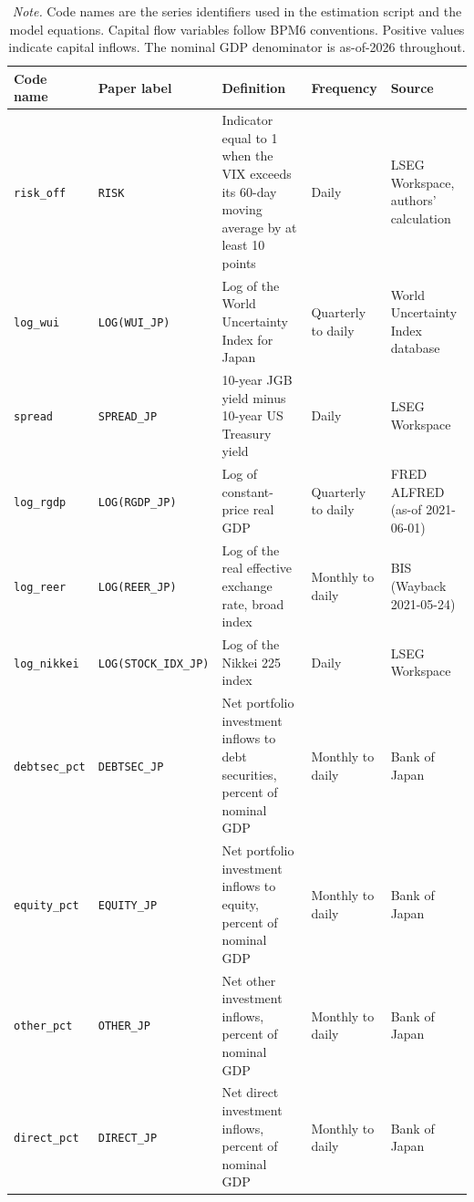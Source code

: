 \begin{table}[H]
  \centering
  \caption{Endogenous Variables, Definitions, and Sources}
  \label{tab:variables}
  \small
  \begin{tabularx}{\textwidth}{@{}p{2.0cm} p{2.5cm} X p{1.7cm} p{2.8cm}@{}}
    \toprule
    Code name & Paper label & Definition & Frequency & Source \\
    \midrule
    \texttt{risk\_off} & \texttt{RISK} & Indicator equal to 1 when the VIX exceeds its 60-day moving average by at least 10 points & Daily & LSEG Workspace, authors' calculation \\
    \texttt{log\_wui} & \texttt{LOG(WUI\_JP)} & Log of the World Uncertainty Index for Japan & Quarterly to daily & World Uncertainty Index database \\
    \texttt{spread} & \texttt{SPREAD\_JP} & 10-year JGB yield minus 10-year US Treasury yield & Daily & LSEG Workspace \\
    \texttt{log\_rgdp} & \texttt{LOG(RGDP\_JP)} & Log of constant-price real GDP & Quarterly to daily & FRED ALFRED (as-of 2021-06-01) \\
    \texttt{log\_reer} & \texttt{LOG(REER\_JP)} & Log of the real effective exchange rate, broad index & Monthly to daily & BIS (Wayback 2021-05-24) \\
    \texttt{log\_nikkei} & \texttt{LOG(STOCK\_\-IDX\_\-JP)} & Log of the Nikkei 225 index & Daily & LSEG Workspace \\
    \texttt{debtsec\_\-pct} & \texttt{DEBTSEC\_JP} & Net portfolio investment inflows to debt securities, percent of nominal GDP & Monthly to daily & Bank of Japan \\
    \texttt{equity\_pct} & \texttt{EQUITY\_JP} & Net portfolio investment inflows to equity, percent of nominal GDP & Monthly to daily & Bank of Japan \\
    \texttt{other\_pct} & \texttt{OTHER\_JP} & Net other investment inflows, percent of nominal GDP & Monthly to daily & Bank of Japan \\
    \texttt{direct\_pct} & \texttt{DIRECT\_JP} & Net direct investment inflows, percent of nominal GDP & Monthly to daily & Bank of Japan \\
    \bottomrule
  \end{tabularx}
  \caption*{\textit{Note.} Code names are the series identifiers used in the estimation script and the model equations. Capital flow variables follow BPM6 conventions. Positive values indicate capital inflows. The nominal GDP denominator is as-of-2026 throughout.}
\end{table}

